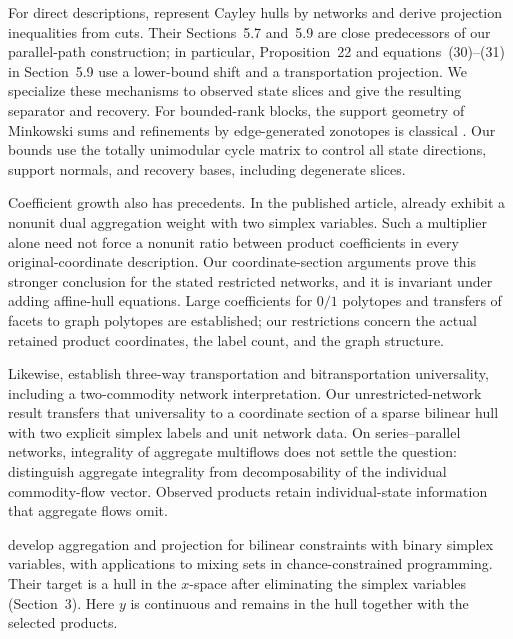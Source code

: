 For direct descriptions, \citet{KisHorvath2022} represent Cayley hulls by
networks and derive projection inequalities from cuts. Their Sections~5.7
and~5.9 are close predecessors of our parallel-path construction; in
particular, Proposition~22 and equations~(30)--(31) in Section~5.9 use a
lower-bound shift and a transportation projection. We specialize these
mechanisms to observed state slices and give the resulting separator and
recovery. For bounded-rank blocks, the support geometry of Minkowski sums
and refinements by edge-generated zonotopes is classical
\citep{GritzmannSturmfels1993,OnnRothblum2004}. Our bounds use the
totally unimodular cycle matrix to control all state directions, support
normals, and recovery bases, including degenerate slices.

Coefficient growth also has precedents. In the published article,
\citet[Example~2]{KhademniaDavarnia2025} already exhibit a nonunit dual
aggregation weight with two simplex variables. Such a multiplier alone need
not force a nonunit ratio between product coefficients in every
original-coordinate description. Our coordinate-section arguments prove
this stronger conclusion for the stated restricted networks, and it is
invariant under adding affine-hull equations. Large coefficients for $0/1$ polytopes
\citep{AlonVu1997} and transfers of facets to graph polytopes
\citep{Fiorini2006} are established; our restrictions concern the actual
retained product coordinates, the label count, and the graph structure.

Likewise, \citet[Theorems~1.1 and~1.2]{DeLoeraOnn2006} establish
three-way transportation and bitransportation universality, including a
two-commodity network interpretation. Our unrestricted-network result
transfers that universality to a coordinate section of a sparse bilinear
hull with two explicit simplex labels and unit network data. On
series--parallel networks, integrality of aggregate multiflows does not
settle the question: \citet[Remark~1]{AlmoghrabiSkutellaWarode2026}
distinguish aggregate integrality from decomposability of the individual
commodity-flow vector. Observed products retain individual-state
information that aggregate flows omit.

\citet{DavarniaRahimian2026} develop aggregation and projection for
bilinear constraints with binary simplex variables, with applications to
mixing sets in chance-constrained programming. Their target is a hull in
the $x$-space after eliminating the simplex variables (Section~3). Here $y$
is continuous and remains in the hull together with the selected products.

